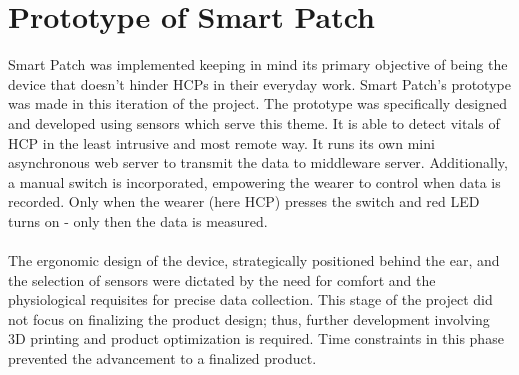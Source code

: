\section{Prototype of Smart Patch}
Smart Patch was implemented keeping in mind its primary objective of being the device that doesn't hinder HCPs in their everyday work. Smart Patch's prototype was made in this iteration of the project. The prototype was specifically designed and developed using sensors which serve this theme. It is able to detect vitals of HCP in the least intrusive and most remote way. It runs its own mini asynchronous web server to transmit the data to middleware server. Additionally, a manual switch is incorporated, empowering the wearer to control when data is recorded. Only when the wearer (here HCP) presses the switch and red LED turns on - only then the data is measured. \\ \\
The ergonomic design of the device, strategically positioned behind the ear, and the selection of sensors were dictated by the need for comfort and the physiological requisites for precise data collection. This stage of the project did not focus on finalizing the product design; thus, further development involving 3D printing and product optimization is required. Time constraints in this phase prevented the advancement to a finalized product.


